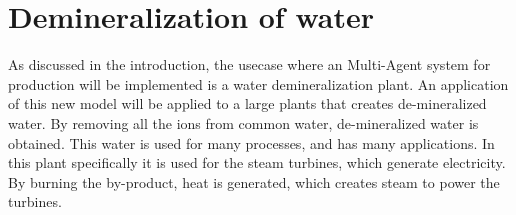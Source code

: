 %		
%	



\section{Demineralization of water}
As discussed in the introduction, the usecase where an Multi-Agent system for production will be implemented is a water demineralization plant. An application of this new model will be applied to a large plants that creates de-mineralized water. By removing all the ions from common water, de-mineralized water is obtained. This water is used for many processes, and has many applications. In this plant specifically it is used for the steam turbines, which generate electricity. By burning the by-product, heat is generated, which creates steam to power the turbines. 

